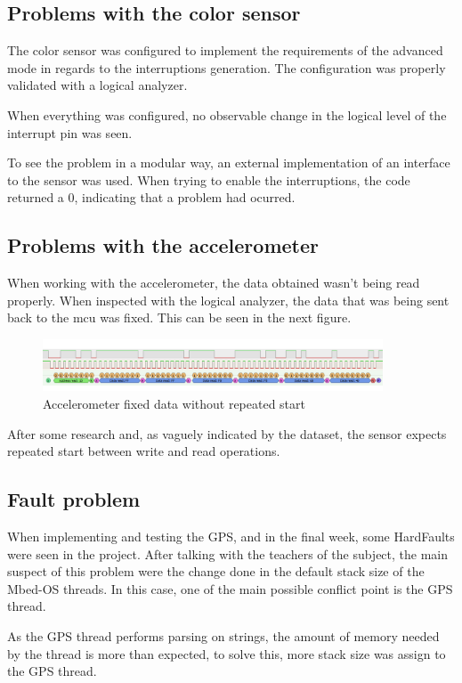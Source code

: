 \subsection{Problems with the color sensor}
The color sensor was configured to implement the requirements of the advanced mode in regards to the interruptions generation. The configuration was properly validated with a logical analyzer.

When everything was configured, no observable change in the logical level of the interrupt pin was seen.

To see the problem in a modular way, an external implementation\cite{TCS3472_I2CClasswhich} of an interface to the sensor was used. When trying to enable the interruptions, the code returned a 0, indicating that 
a problem had ocurred.
\subsection{Problems with the accelerometer}
When working with the accelerometer, the data obtained wasn't being read properly. When inspected with the logical analyzer, the data that was being sent back to the \acrshort{mcu} was fixed. This can be seen in the next figure.
\begin{figure}[H]
    \centering
    \includegraphics[width=0.9\textwidth]{images/6/accProblem.png}
    \caption{Accelerometer fixed data without repeated start}
    \label{fig:accProblems}
\end{figure}
After some research and, as vaguely indicated by the dataset\cite{MMA8451Q1a}, the sensor expects repeated start between write and read operations.
\subsection{Fault problem}
When implementing and testing the GPS, and in the final week, some HardFaults were seen in the project. After talking with the teachers of the subject, the main suspect of this problem were 
the change done in the default stack size of the Mbed-OS threads. In this case, one of the main possible conflict point is the GPS thread.

As the GPS thread performs parsing on strings, the amount of memory needed by the thread is more than expected, to solve this, more stack size was assign to the GPS thread.